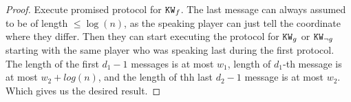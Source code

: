 \begin{proof}
    Execute promised protocol for $\mathtt{KW}_f$. The last message can always assumed to be of length $\leq
    \log(n)$, as the speaking player can just tell the coordinate where they differ. Then they can start
    executing the protocol for $\mathtt{KW}_g$ or $\mathtt{KW}_{\neg g}$ starting with the same player who was speaking
    last during the first protocol. The length of the first $d_1 - 1$ messages is at most $w_1$, length of
    $d_1$-th message is at most $w_2+log(n)$, and the length of thh last $d_2 - 1$ message is at most
    $w_2$. Which gives us the desired result.
\end{proof}


